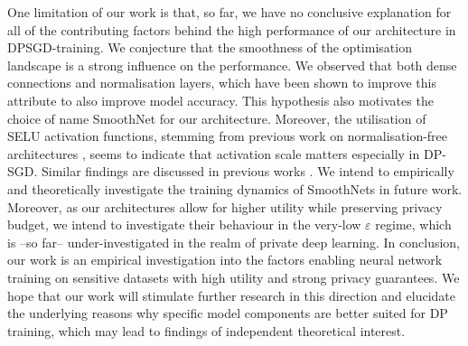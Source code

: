 \documentclass[nohyperref]{article}
\theoremstyle{plain}
\theoremstyle{definition}
\theoremstyle{remark}
\begin{document}
One limitation of our work is that, so far, we have no conclusive explanation for all of the contributing factors behind the high performance of our architecture in \acs{DPSGD}-training. We conjecture that the smoothness of the optimisation landscape is a strong influence on the performance. We observed that both dense connections and normalisation layers, which have been shown to improve this attribute \cite{li2018visualizing, santurkar2019does} to also improve model accuracy. This hypothesis also motivates the choice of name SmoothNet for our architecture. Moreover, the utilisation of SELU activation functions, stemming from previous work on normalisation-free architectures \citep{klambauer2017self}, seems to indicate that activation scale matters especially in DP-SGD. Similar findings are discussed in previous works \citep{papernot2020tempered, klause2022differentially}. We intend to empirically and theoretically investigate the training dynamics of SmoothNets in future work. Moreover, as our architectures allow for higher utility while preserving privacy budget, we intend to investigate their behaviour in the very-low $\varepsilon$ regime, which is --so far-- under-investigated in the realm of private deep learning.
In conclusion, our work is an empirical investigation into the factors enabling neural network training on sensitive datasets with high utility and strong privacy guarantees. We hope that our work will stimulate further research in this direction and elucidate the underlying reasons why specific model components are better suited for \acs{DP} training, which may lead to findings of independent theoretical interest.

\newpage




\newpage
\appendix
\onecolumn
\end{document}

